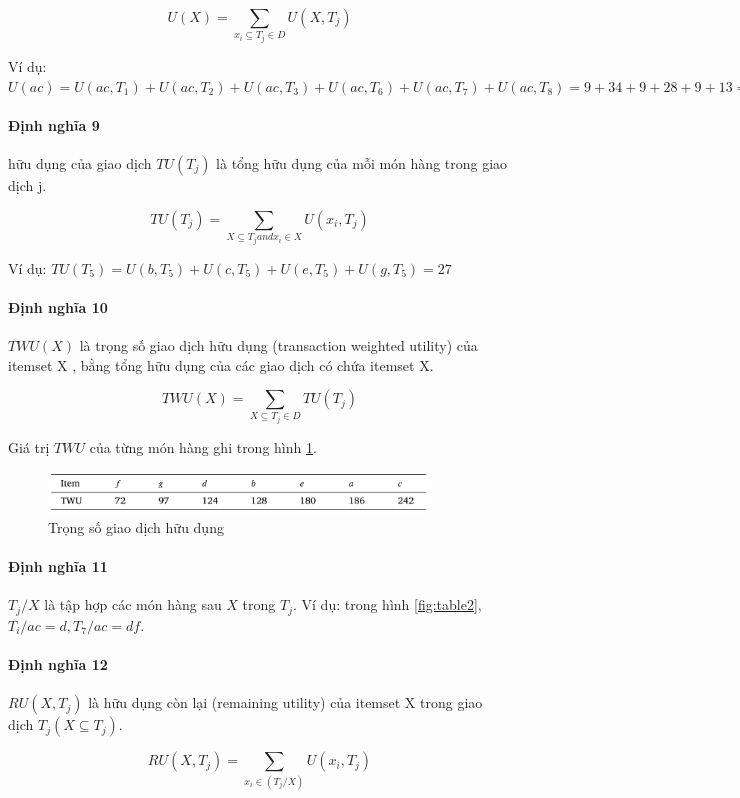 $$ U(X) = \sum_{x_i \subseteq T_j \in D} U(X, T_j) $$

Ví dụ: $U(ac) = U(ac, T_1) + U(ac, T_2) + U(ac, T_3) + U(ac, T_6) + U(ac, T_7) + U(ac, T_8) = 9 + 34 + 9 + 28 + 9 + 13 = 101 $

\paragraph{Định nghĩa 9} hữu dụng của giao dịch $TU(T_j)$ là tổng hữu dụng của mỗi món hàng trong giao dịch j.

$$ TU(T_j) = \sum_{X \subseteq T_j and x_i \in X} U(x_i, T_j) $$

Ví dụ: $TU(T_5) = U(b, T_5) + U(c, T_5) + U(e, T_5) + U(g, T_5) = 27$

\paragraph{Định nghĩa 10}  $TWU(X)$ là trọng số giao dịch hữu dụng (transaction weighted utility) của itemset X , bằng tổng hữu dụng của các giao dịch có chứa itemset X.

$$ TWU(X) = \sum_{X \subseteq T_j \in D} TU(T_j) $$

Giá trị $TWU$ của từng món hàng ghi trong hình \ref{fig:table4}.



\begin{figure}[h]
\centering
\includegraphics[width=0.9\textwidth]{image/table/table4.PNG}
\caption{\label{fig:table4} Trọng số giao dịch hữu dụng  }
\end{figure}

\paragraph{Định nghĩa 11} $T_j/X$ là tập hợp các món hàng sau $X$ trong $T_j$. Ví dụ: trong hình \ref{fig:table2}, $T_i/ac = d, T_7/ac = df$.

\paragraph{Định nghĩa 12} $RU(X, T_j)$  là hữu dụng còn lại (remaining utility) của itemset X trong giao dịch $T_j(X \subseteq T_j)$.

$$ RU(X, T_j) = \sum_{x_i \in (T_j/X)} U(x_i, T_j) $$

